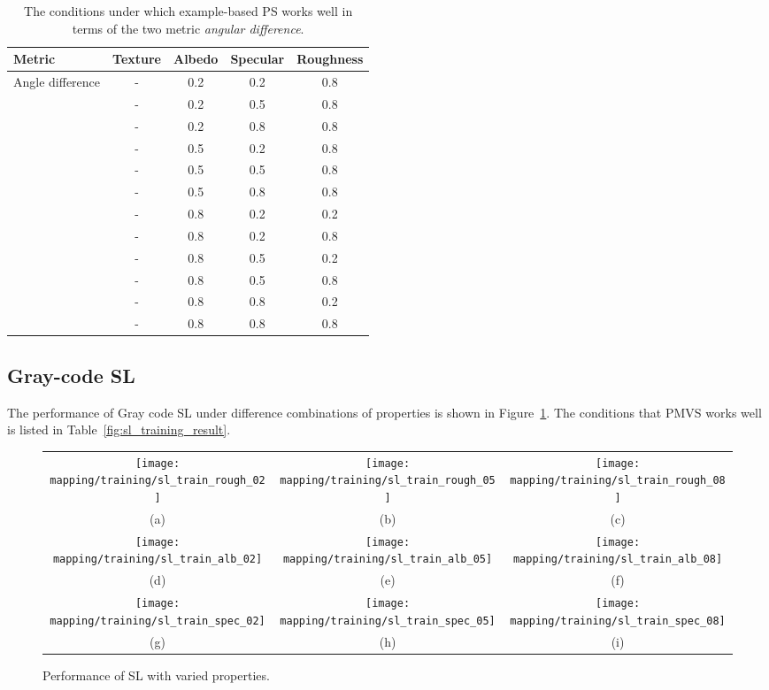\begin{table}[!htbp]
  \centering
  \begin{tabular}{l*{4}{c}}
  \hline
  \textbf{Metric} & Texture & Albedo & Specular & Roughness\\
  \hline
  Angle difference & - & 0.2 & 0.2 & 0.8\\
                   & - & 0.2 & 0.5 & 0.8\\
                   & - & 0.2 & 0.8 & 0.8\\
                   & - & 0.5 & 0.2 & 0.8\\
                   & - & 0.5 & 0.5 & 0.8\\
                   & - & 0.5 & 0.8 & 0.8\\
                   & - & 0.8 & 0.2 & 0.2\\
                   & - & 0.8 & 0.2 & 0.8\\
                   & - & 0.8 & 0.5 & 0.2\\
                   & - & 0.8 & 0.5 & 0.8\\
                   & - & 0.8 & 0.8 & 0.2\\
                   & - & 0.8 & 0.8 & 0.8\\
  \hline
  \end{tabular}
  \caption{The conditions under which example-based PS works well in terms of the two metric \textit{angular difference}.}
  \label{tab:ps_training_result}
\end{table}

\subsection{Gray-code SL}
The performance of Gray code SL under difference combinations of properties is shown in Figure~\ref{fig:sl_training}. The conditions that PMVS works well is listed in Table~\ref{fig:sl_training_result}.
\begin{figure}[!htbp]
\begin{tabular}{ccc}
\texttt{[image: mapping/training/sl\_train\_rough\_02]}&
\texttt{[image: mapping/training/sl\_train\_rough\_05]}&
\texttt{[image: mapping/training/sl\_train\_rough\_08]}\\
(a) & (b) & (c)\\
\texttt{[image: mapping/training/sl\_train\_alb\_02]}&
\texttt{[image: mapping/training/sl\_train\_alb\_05]}&
\texttt{[image: mapping/training/sl\_train\_alb\_08]}\\
(d) & (e) & (f)\\
\texttt{[image: mapping/training/sl\_train\_spec\_02]}&
\texttt{[image: mapping/training/sl\_train\_spec\_05]}&
\texttt{[image: mapping/training/sl\_train\_spec\_08]}\\
(g) & (h) & (i)\\
\end{tabular}
\caption{Performance of SL with varied properties.}
\label{fig:sl_training}
\end{figure}

